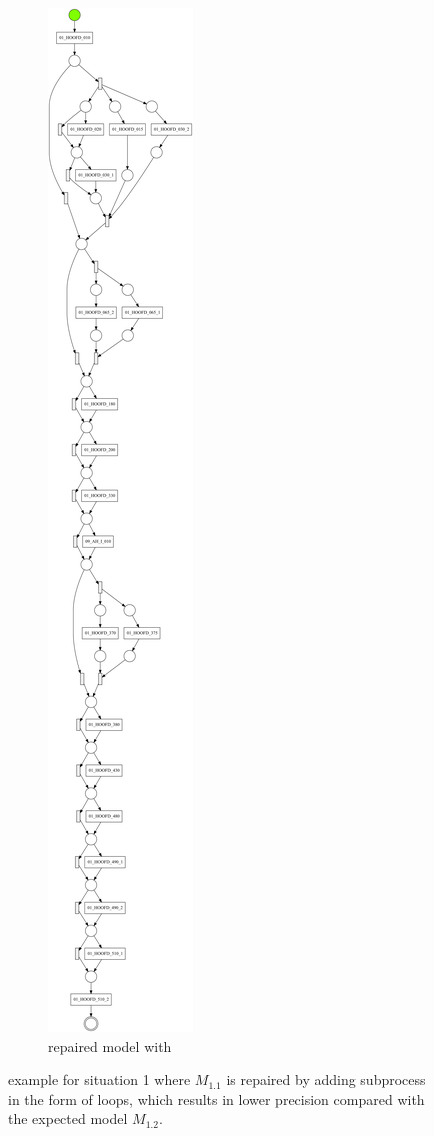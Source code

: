 \begin{figure}[htp]
\begin{subfigure}[b]{0.48\textwidth}
	\end{subfigure}%
	\begin{subfigure}[b]{0.48\textwidth}
		\centering
		\includegraphics[width=0.5\linewidth, height=0.7\textheight]{figures/evaluation/PN-result-D5-3-M1-dfg-1-1-1.pdf}
		\caption{repaired model with }
		\label{fig:model_dfg}
	\end{subfigure}
	\caption{example for situation 1 where $M_{1.1}$ is repaired by adding subprocess in the form of loops, which results in lower precision compared with the expected model $M_{1.2}$.}
	\label{fig:model_change_1}
\end{figure}




